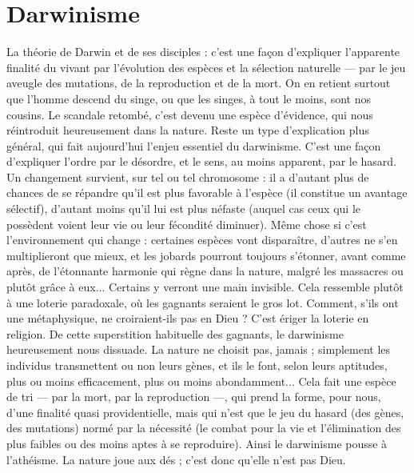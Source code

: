 \section{Darwinisme}
La théorie de Darwin et de ses disciples : c’est une façon
d’expliquer l’apparente finalité du vivant par l’évolution des
espèces et la sélection naturelle — par le jeu aveugle des mutations, de la reproduction
et de la mort. On en retient surtout que l’homme descend du singe, ou
que les singes, à tout le moins, sont nos cousins. Le scandale retombé, c’est
devenu une espèce d’évidence, qui nous réintroduit heureusement dans la
nature. Reste un type d’explication plus général, qui fait aujourd’hui l’enjeu
essentiel du darwinisme. C’est une façon d’expliquer l’ordre par le désordre, et
le sens, au moins apparent, par le hasard. Un changement survient, sur tel ou
tel chromosome : il a d’autant plus de chances de se répandre qu’il est plus
favorable à l’espèce (il constitue un avantage sélectif), d'autant moins qu’il lui
est plus néfaste (auquel cas ceux qui le possèdent voient leur vie ou leur fécondité
diminuer). Même chose si c’est l’environnement qui change : certaines
espèces vont disparaître, d’autres ne s’en multiplieront que mieux, et les jobards
pourront toujours s'étonner, avant comme après, de l’étonnante harmonie qui
règne dans la nature, malgré les massacres ou plutôt grâce à eux... Certains y
verront une main invisible. Cela ressemble plutôt à une loterie paradoxale, où
les gagnants seraient le gros lot. Comment, s’ils ont une métaphysique, ne croiraient-ils
pas en Dieu ? C’est ériger la loterie en religion. De cette superstition
habituelle des gagnants, le darwinisme heureusement nous dissuade. La nature
ne choisit pas, jamais ; simplement les individus transmettent ou non leurs
gènes, et ils le font, selon leurs aptitudes, plus ou moins efficacement, plus ou
moins abondamment... Cela fait une espèce de tri — par la mort, par la reproduction —,
qui prend la forme, pour nous, d’une finalité quasi providentielle,
mais qui n’est que le jeu du hasard (des gènes, des mutations) normé par la
nécessité (le combat pour la vie et l'élimination des plus faibles ou des moins
aptes à se reproduire). Ainsi le darwinisme pousse à l’athéisme. La nature joue
aux dés ; c’est donc qu’elle n’est pas Dieu.

